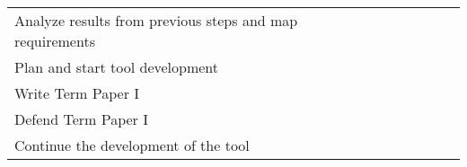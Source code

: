 \begin{table}
\begin{tabular}{p{3cm}|l|llll|lll|ll}
    \rowcolor[rgb]{0.914,0.914,0.914} Analyze results from previous steps and map requirements                                        &                                      & {\cellcolor[rgb]{0.753,0.753,0.753}} & {\cellcolor[rgb]{0.753,0.753,0.753}} &                                      &                                      &                                      &                                      &                                      &                                      &                                      \\
    Plan and start tool development                                                                                                   &                                      &                                      & {\cellcolor[rgb]{0.753,0.753,0.753}} & {\cellcolor[rgb]{0.753,0.753,0.753}} &                                      &                                      &                                      &                                      &                                      &                                      \\
    \rowcolor[rgb]{0.914,0.914,0.914} Write Term Paper I                                                                              &                                      &                                      &                                      & {\cellcolor[rgb]{0.753,0.753,0.753}} & {\cellcolor[rgb]{0.753,0.753,0.753}} & {\cellcolor[rgb]{0.753,0.753,0.753}} &                                      &                                      &                                      &                                      \\
    Defend Term Paper I                                                                                                               &                                      &                                      &                                      &                                      &                                      & {\cellcolor[rgb]{0.753,0.753,0.753}} &                                      &                                      &                                      &                                      \\
    \rowcolor[rgb]{0.914,0.914,0.914} Continue the development of the tool                                                            &                                      &                                      &                                      &                                      &                                      &                                      & {\cellcolor[rgb]{0.753,0.753,0.753}} & {\cellcolor[rgb]{0.753,0.753,0.753}} &                                      &                                      \\

\end{tabular}
\end{table}
